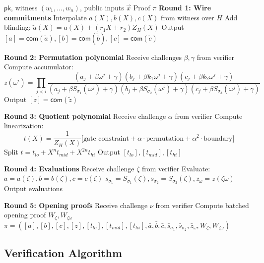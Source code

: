 \documentclass[11pt,a4paper]{article}
\newcommand{\com}{\mathsf{com}}
\begin{document}
\begin{algorithm}
\caption{PLONK Prover}
\label{alg:plonk-prove}
\begin{algorithmic}[1]
\Require $\mathsf{pk}$, witness $(w_1, \ldots, w_n)$, public inputs $\vec{x}$
\Ensure Proof $\pi$
\State \textbf{Round 1: Wire commitments}
\State Interpolate $a(X), b(X), c(X)$ from witness over $H$
\State Add blinding: $\tilde{a}(X) = a(X) + (r_1 X + r_2) Z_H(X)$
\State Output $[a] = \com(\tilde{a}), [b] = \com(\tilde{b}), [c] = \com(\tilde{c})$

\State \textbf{Round 2: Permutation polynomial}
\State Receive challenges $\beta, \gamma$ from verifier
\State Compute accumulator:
\[
z(\omega^i) = \prod_{j<i} \frac{(a_j + \beta \omega^j + \gamma)(b_j + \beta k_1 \omega^j + \gamma)(c_j + \beta k_2 \omega^j + \gamma)}{(a_j + \beta S_{\sigma_1}(\omega^j) + \gamma)(b_j + \beta S_{\sigma_2}(\omega^j) + \gamma)(c_j + \beta S_{\sigma_3}(\omega^j) + \gamma)}
\]
\State Output $[z] = \com(\tilde{z})$

\State \textbf{Round 3: Quotient polynomial}
\State Receive challenge $\alpha$ from verifier
\State Compute linearization:
\[
t(X) = \frac{1}{Z_H(X)} \big[ \text{gate constraint} + \alpha \cdot \text{permutation} + \alpha^2 \cdot \text{boundary} \big]
\]
\State Split $t = t_{lo} + X^n t_{mid} + X^{2n} t_{hi}$
\State Output $[t_{lo}], [t_{mid}], [t_{hi}]$

\State \textbf{Round 4: Evaluations}
\State Receive challenge $\zeta$ from verifier
\State Evaluate: $\bar{a} = a(\zeta), \bar{b} = b(\zeta), \bar{c} = c(\zeta)$
\State $\bar{s}_{\sigma_1} = S_{\sigma_1}(\zeta), \bar{s}_{\sigma_2} = S_{\sigma_2}(\zeta), \bar{z}_\omega = z(\zeta \omega)$
\State Output evaluations

\State \textbf{Round 5: Opening proofs}
\State Receive challenge $\nu$ from verifier
\State Compute batched opening proof $W_\zeta, W_{\zeta\omega}$
\State \Return $\pi = ([a], [b], [c], [z], [t_{lo}], [t_{mid}], [t_{hi}], \bar{a}, \bar{b}, \bar{c}, \bar{s}_{\sigma_1}, \bar{s}_{\sigma_2}, \bar{z}_\omega, W_\zeta, W_{\zeta\omega})$
\end{algorithmic}
\end{algorithm}

\subsection{Verification Algorithm}
\end{document}

